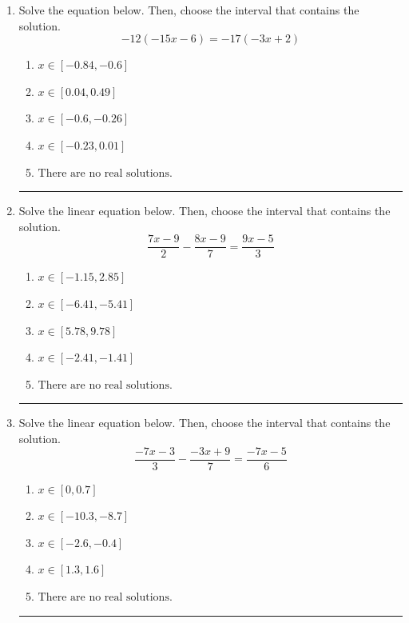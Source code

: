 \documentclass[14pt]{extbook}
\newcommand{\litem}[1]{\item#1\hspace*{-1cm}\rule{\textwidth}{0.4pt}}
\begin{document}
\begin{enumerate}
{\begin{enumerate}[label=\Alph*.]
\end{enumerate} }
\litem{
Solve the equation below. Then, choose the interval that contains the solution.\[ -12(-15x -6) = -17(-3x + 2) \]\begin{enumerate}[label=\Alph*.]
\item \( x \in [-0.84, -0.6] \)
\item \( x \in [0.04, 0.49] \)
\item \( x \in [-0.6, -0.26] \)
\item \( x \in [-0.23, 0.01] \)
\item \( \text{There are no real solutions.} \)

\end{enumerate} }
\litem{
Solve the linear equation below. Then, choose the interval that contains the solution.\[ \frac{7x -9}{2} - \frac{8x -9}{7} = \frac{9x -5}{3} \]\begin{enumerate}[label=\Alph*.]
\item \( x \in [-1.15, 2.85] \)
\item \( x \in [-6.41, -5.41] \)
\item \( x \in [5.78, 9.78] \)
\item \( x \in [-2.41, -1.41] \)
\item \( \text{There are no real solutions.} \)

\end{enumerate} }
\litem{
Solve the linear equation below. Then, choose the interval that contains the solution.\[ \frac{-7x -3}{3} - \frac{-3x + 9}{7} = \frac{-7x -5}{6} \]\begin{enumerate}[label=\Alph*.]
\item \( x \in [0, 0.7] \)
\item \( x \in [-10.3, -8.7] \)
\item \( x \in [-2.6, -0.4] \)
\item \( x \in [1.3, 1.6] \)
\item \( \text{There are no real solutions.} \)


\end{enumerate}}
\end{enumerate}
\end{document}
